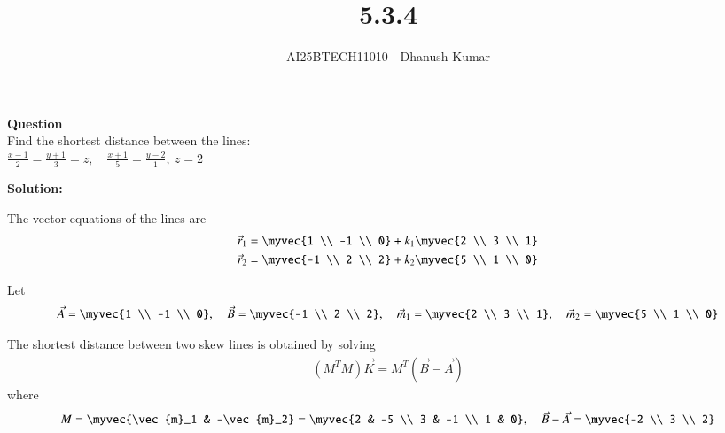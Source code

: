 \documentclass[journal]{IEEEtran}
\begin{document}
\title{5.3.4}
\author{AI25BTECH11010 - Dhanush Kumar}
\maketitle
\renewcommand{\thefigure}{\theenumi}
\renewcommand{\thetable}{\theenumi}

\textbf{Question}\\
Find the shortest distance between the lines:\\
$
\frac{x - 1}{2} = \frac{y + 1}{3} = z, \quad 
\frac{x + 1}{5} = \frac{y - 2}{1}, \ z = 2
$

\textbf{Solution:}

The vector equations of the lines are
\begin{align}
\vec{r}_1 = \myvec{1 \\ -1 \\ 0} + k_1 \myvec{2 \\ 3 \\ 1} \\
\vec{r}_2 = \myvec{-1 \\ 2 \\ 2} + k_2 \myvec{5 \\ 1 \\ 0}
\end{align}

Let 
\begin{align}
\vec{A} = \myvec{1 \\ -1 \\ 0}, \quad 
\vec{B} = \myvec{-1 \\ 2 \\ 2}, \quad
\vec{m}_1 = \myvec{2 \\ 3 \\ 1}, \quad 
\vec{m}_2 = \myvec{5 \\ 1 \\ 0}
\end{align}

The shortest distance between two skew lines is obtained by solving
\begin{align}
(M^T M)\vec{K} = M^T(\vec{B} - \vec{A})
\end{align}
where 
\begin{align}
M = \myvec{\vec{m}_1 & -\vec{m}_2} 
= \myvec{2 & -5 \\ 3 & -1 \\ 1 & 0}, \quad
\vec{B} - \vec{A} = \myvec{-2 \\ 3 \\ 2}
\end{align}
\end{document}
